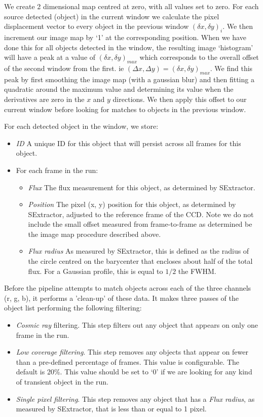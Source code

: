 We create 2 dimensional map centred at zero, with all values set to zero. For each source detected (object) in the current window we calculate the pixel displacement vector to every object in the previous window $(\delta x, \delta y)_i$.  We then increment our image map by `1' at the corresponding position. When we have done this for all objects detected in the window, the resulting image `histogram' will have a peak at a value of $(\delta x, \delta y)_{max}$ which corresponds to the overall offset of the second window from the first. ie $(\Delta x, \Delta y) = (\delta x, \delta y)_{max}$. We find this peak by first smoothing the image map (with a gaussian blur) and then fitting a quadratic around the maximum value and determining its value when the derivatives are zero in the $x$ and $y$ directions. We then apply this offset to our current window before looking for matches to objects in the previous window.

For each detected object in the window, we store: 
\begin{itemize}
  \item \emph{ID} A unique ID for this object that will persist across all frames for this object.
  \item For each frame in the run:
  \begin{itemize}
    \item \emph{Flux} The flux measurement for this object, as determined by SExtractor.
    \item \emph{Position} The pixel (x, y) position for this object, as determined by SExtractor, adjusted to the reference frame of the CCD. Note we do not include the small offset measured from frame-to-frame as determined be the image map procedure described above. 
    \item \emph{Flux radius} As measured by SExtractor, this is defined as the radius of the circle centred on the barycenter that encloses about half of the total flux. For a Gaussian profile, this is equal to $1/2$ the FWHM. 
  \end{itemize}
\end{itemize}

Before the pipeline attempts to match objects across each of the three channels (r, g, b), it performs a 'clean-up' of these data. It makes three passes of the object list performing the following filtering:

\begin{itemize}
  \item \emph{Cosmic ray} filtering. This step filters out any object that appears on only one frame in the run. 
  \item \emph{Low coverage filtering}. This step removes any objects that appear on fewer than a pre-defined percentage of frames. This value is configurable. The default is 20\%. This value should be set to `0' if we are looking for any kind of transient object in the run. 
  \item \emph{Single pixel filtering}. This step removes any object that has a \emph{Flux radius}, as measured by SExtractor, that is less than or equal to 1 pixel.
\end{itemize}

